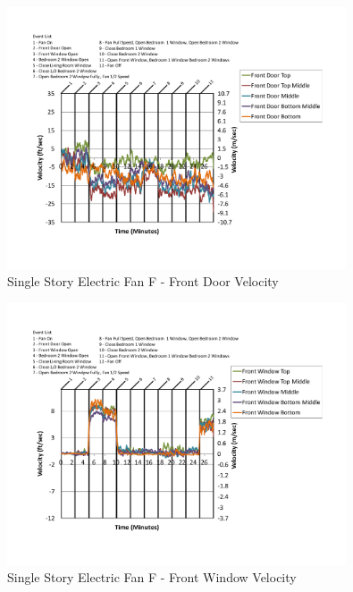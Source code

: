 \documentclass{article}
\begin{document}
\begin{appendices}
	\begin{figure}[H]
		\centering
		\includegraphics[height=3.05in,trim=0.67in 1.1in 0.67in 0.8in,clip=true]{0_Images/Results_Charts/ColdFlow/Single_Story/Electric/F/Front_Door_Velocity.pdf}
		\caption{Single Story Electric Fan F - Front Door Velocity}
	\end{figure}
 

	\begin{figure}[H]
		\centering
		\includegraphics[height=3.05in,trim=0.67in 1.1in 0.67in 0.8in,clip=true]{0_Images/Results_Charts/ColdFlow/Single_Story/Electric/F/Front_Window_Velocity.pdf}
		\caption{Single Story Electric Fan F - Front Window Velocity}
	\end{figure}
 
	\clearpage


\end{appendices}
\end{document}

